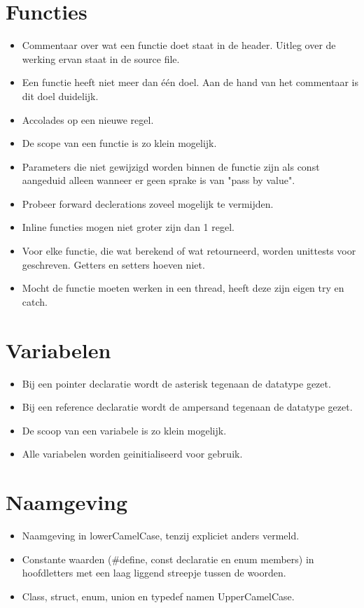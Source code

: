 \documentclass[a4paper, 11pt, oneside]{report}
\begin{document}
\section{Functies}
\begin{itemize}
\item Commentaar over wat een functie doet staat in de header. Uitleg over de werking ervan staat in de source file.
\item Een functie heeft niet meer dan één doel. Aan de hand van het commentaar is dit doel duidelijk.
\item Accolades op een nieuwe regel.
\item De scope van een functie is zo klein mogelijk.
\item Parameters die niet gewijzigd worden binnen de functie zijn als const aangeduid alleen wanneer er geen sprake is van "pass by value".
\item Probeer forward declerations zoveel mogelijk te vermijden.
\item Inline functies mogen niet groter zijn dan 1 regel.
\item Voor elke functie, die wat berekend of wat retourneerd, worden unittests voor geschreven. Getters en setters hoeven niet.
\item Mocht de functie moeten werken in een thread, heeft deze zijn eigen try en catch.
\end{itemize}

\section{Variabelen}
\begin{itemize}
\item Bij een pointer declaratie wordt de asterisk tegenaan de datatype gezet.
\item Bij een reference declaratie wordt de ampersand tegenaan de datatype gezet.
\item De scoop van een variabele is zo klein mogelijk.
\item Alle variabelen worden geinitialiseerd voor gebruik.
\end{itemize}
\section{Naamgeving}
\begin{itemize}
\item Naamgeving in lowerCamelCase, tenzij expliciet anders vermeld.
\item Constante waarden (\#define, const declaratie en enum members) in hoofdletters met een laag liggend streepje tussen de woorden.
\item Class, struct, enum, union en typedef namen UpperCamelCase.

\end{itemize}
\end{document}
